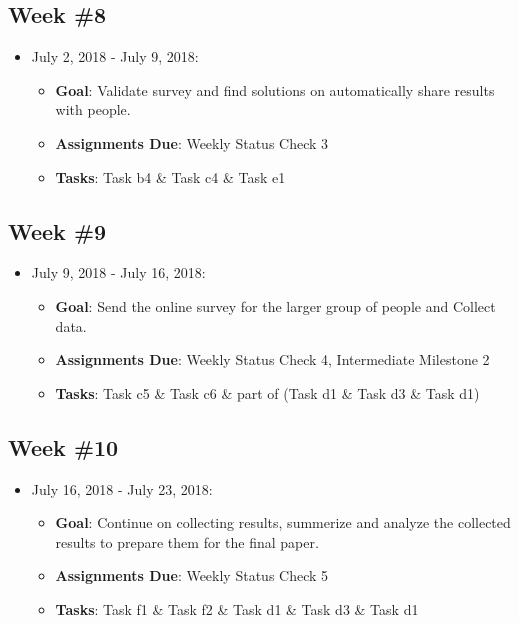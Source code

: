 \documentclass{sigchi}
\begin{document}
 \subsection{Week \#8}
\begin{itemize}
 	\item July 2, 2018 - July 9, 2018:
	\begin{itemize}
 		\item \textbf{Goal}: Validate survey and find solutions on automatically share results with people.
 		\item \textbf{Assignments Due}: Weekly Status Check 3
 		\item \textbf{Tasks}: Task b4 \& Task c4 \& Task e1 
	\end{itemize} 
 \end{itemize} 
 
 \subsection{Week \#9}
\begin{itemize}
 	\item July 9, 2018 - July 16, 2018:
	\begin{itemize}
	 	\item \textbf{Goal}: Send the online survey for the larger group of people and Collect data.
 		\item \textbf{Assignments Due}: Weekly Status Check 4, Intermediate Milestone 2
 		\item \textbf{Tasks}: Task c5 \& Task c6  \& part of (Task d1 \& Task d3 \& Task d1)
	\end{itemize} 
 \end{itemize} 
 
 \subsection{Week \#10}
\begin{itemize}
 	\item July 16, 2018 - July 23, 2018:
	\begin{itemize}
 		\item \textbf{Goal}: Continue on collecting results, summerize and analyze the collected results to prepare them for the final paper. 
 		\item \textbf{Assignments Due}: Weekly Status Check 5
 		\item \textbf{Tasks}: Task f1 \& Task f2  \& Task d1 \& Task d3 \& Task d1
	\end{itemize} 
 \end{itemize} 
 
\end{document}

